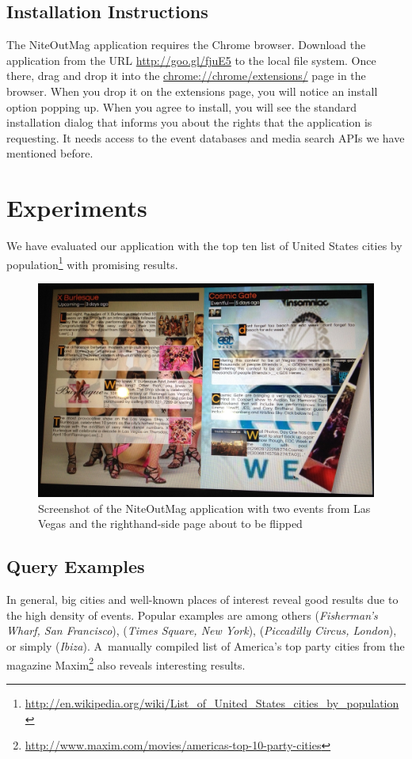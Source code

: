 \documentclass[runningheads,a4paper]{llncs}
\begin{document}
{\subsection{Installation Instructions}
The NiteOutMag application requires the Chrome browser. Download the application from the URL \url{http://goo.gl/fjuE5} to the local file system.
Once there, drag and drop it into the \url{chrome://chrome/extensions/} page in the browser. When you drop it on the extensions page, you will notice an install option popping up. When you agree to install, you will see the standard installation dialog that informs you about the rights that the application is requesting. It needs access to the event databases and media search APIs we have mentioned before.


\section{Experiments}                                                       \label{sec:experiments}
We have evaluated our application with the top ten list of United States cities by population\footnote{\url{http://en.wikipedia.org/wiki/List_of_United_States_cities_by_population}} with promising results.

\begin{figure}[b!]
\centering
\includegraphics[width=1.0\columnwidth]{./screenshot.jpg}
\caption{Screenshot of the NiteOutMag application with two events from Las Vegas and the righthand-side page about to be flipped}
\label{fig:screenshot}
\end{figure}

\subsection{Query Examples}
In general, big cities and well-known places of interest reveal good results due to the high density of events. Popular examples are among others (\emph{Fisherman's Wharf, San Francisco}), (\emph{Times Square, New York}), (\emph{Piccadilly Circus, London}), or simply (\emph{Ibiza}). A~manually compiled list of America's top party cities from the magazine Maxim\footnote{\url{http://www.maxim.com/movies/americas-top-10-party-cities}} also reveals interesting results.

}
\end{document}
